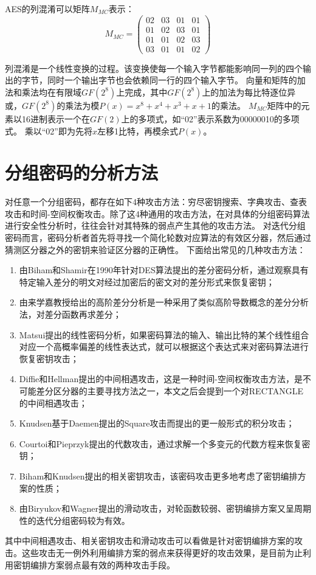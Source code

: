 AES的列混淆可以矩阵$M_{MC}$表示：
\begin{equation}
    M_{MC}=\left(
    \begin{array}{cccc}
        02&03&01&01\\
        01&02&03&01\\
        01&01&02&03\\
        03&01&01&02
    \end{array}
\right)
\label{eq:MC}
\end{equation}

列混淆是一个线性变换的过程。该变换使每一个输入字节都能影响同一列的四个输出的字节，同时一个输出字节也会依赖同一行的四个输入字节。
向量和矩阵的加法和乘法均在有限域$GF(2^8)$上完成，其中$GF(2^8)$上的加法为每比特逐位异或，$GF(2^8)$的乘法为模$P(x)=x^8+x^4+x^3+x+1$的乘法。
$M_{MC}$矩阵中的元素以16进制表示一个在$GF(2)$上的多项式，如“02”表示系数为00000010的多项式。
乘以“02”即为先将$x$左移1比特，再模余式$P(x)$。 

\section{分组密码的分析方法}
对任意一个分组密码，都存在如下4种攻击方法：穷尽密钥搜索、字典攻击、查表攻击和时间-空间权衡攻击。除了这4种通用的攻击方法，在对具体的分组密码算法进行安全性分析时，往往会针对其特殊的弱点产生其他的攻击方法。
对迭代分组密码而言，密码分析者首先将寻找一个简化轮数对应算法的有效区分器，然后通过猜测区分器之外的密钥来验证区分器的正确性。
下面给出常见的几种攻击方法：
\begin{enumerate}
    \item 由Biham和Shamir在1990年针对DES算法提出的差分密码分析\cite{biham1991differential}，通过观察具有特定输入差分的明文对经过加密后的密文对的差分形式来恢复密钥；
    \item 由来学嘉教授给出的高阶差分分析\cite{lai1994higher}是一种采用了类似高阶导数概念的差分分析法，对差分函数再求差分；
    \item Matsui提出的线性密码分析\cite{matsui1993linear}，如果密码算法的输入、输出比特的某个线性组合对应一个高概率偏差的线性表达式，就可以根据这个表达式来对密码算法进行恢复密钥攻击；
    \item Diffie和Hellman提出的中间相遇攻击\cite{diffie1977special}，这是一种时间-空间权衡攻击方法，是不可能差分区分器的主要寻找方法之一，本文之后会提到一个对RECTANGLE的中间相遇攻击；
    \item Knudsen基于Daemen提出的Square攻击\cite{daemen1997block}而提出的更一般形式的积分攻击\cite{knudsen2002integral}；
    \item Courtoi和Pieprzyk提出的代数攻击\cite{courtois2002cryptanalysis}，通过求解一个多变元的代数方程来恢复密钥；
    \item Biham和Knudsen提出的相关密钥攻击\cite{biham1994new}，该密码攻击更多地考虑了密钥编排方案的性质；
    \item 由Biryukov和Wagner提出的滑动攻击\cite{biryukov1999slide}，对轮函数较弱、密钥编排方案又呈周期性的迭代分组密码较为有效。
\end{enumerate}

其中中间相遇攻击、相关密钥攻击和滑动攻击可以看做是针对密钥编排方案的攻击。这些攻击无一例外利用编排方案的弱点来获得更好的攻击效果，是目前为止利用密钥编排方案弱点最有效的两种攻击手段。
